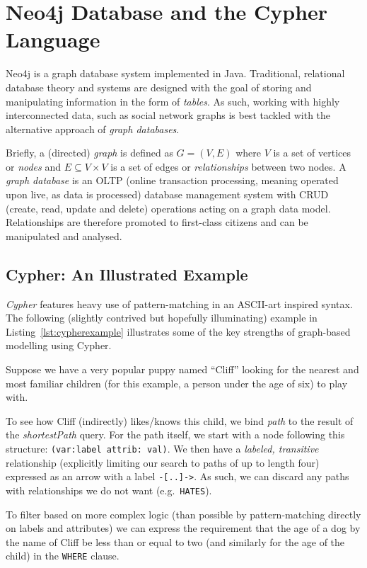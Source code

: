\section{Neo4j Database and the Cypher Language}

Neo4j is a graph database system implemented in Java. Traditional, relational
database theory and systems are designed with the goal of storing and
manipulating information in the form of \emph{tables}. As such, working with
highly interconnected data, such as social network graphs is best tackled with
the alternative approach of \emph{graph databases}.

Briefly, a (directed) \emph{graph} is defined as $G = (V, E)$ where $V$ is a set
of vertices or \emph{nodes} and $E \subseteq V \times V$ is a set of edges or
\emph{relationships} between two nodes. A \emph{graph database} is an OLTP
(online transaction processing, meaning operated upon live, as data is
processed) database management system with CRUD (create, read, update and delete)
operations acting on a graph data model. Relationships are therefore promoted to
first-class citizens and can be manipulated and analysed.

\subsection*{Cypher: An Illustrated Example}

\emph{Cypher} features heavy use of pattern-matching in an ASCII-art inspired
syntax.  The following (slightly contrived but hopefully illuminating) example
in Listing~\ref{lst:cypherexample} illustrates some of the key strengths of
graph-based modelling using Cypher. 

Suppose we have a very popular puppy named ``Cliff'' looking for the nearest
and most familiar children (for this example, a person under the age of six) to
play with.

To see how Cliff (indirectly) likes/knows this child, we bind \emph{path} to the
result of the \emph{shortestPath} query.  For the path itself, we start with a
node following this structure: \texttt{(var:label {attrib: val})}.
We then have a \emph{labeled, transitive} relationship (explicitly limiting our
search to paths of up to length four) expressed as an arrow with a label
\texttt{-[..]->}. As such, we can discard any paths with relationships we do not
want (e.g.\ \texttt{HATES}). 

To filter based on more complex logic (than possible by pattern-matching directly
on labels and attributes) we can express the requirement that the age of a dog by
the name of Cliff be less than or equal to two (and similarly for the age of the
child) in the \texttt{WHERE} clause.

